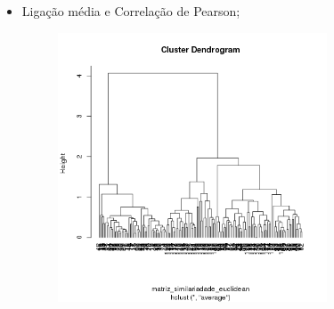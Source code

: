 \documentclass[a4paper, 12pt]{article}
\begin{document}
\begin{enumerate}
\begin{itemize}
    \item Ligação média e Correlação de Pearson;
    \begin{figure}[h!]
    \centering
    \includegraphics[width=80mm]{img15.png}
    \end{figure}

  \end{itemize}

\end{enumerate}
\end{document}
